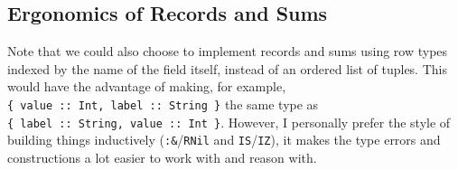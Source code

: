 \documentclass[]{article}
\newenvironment{Shaded}{}{}
\newcommand{\DataTypeTok}[1]{\textcolor[rgb]{0.56,0.13,0.00}{#1}}
\newcommand{\FunctionTok}[1]{\textcolor[rgb]{0.02,0.16,0.49}{#1}}
\newcommand{\KeywordTok}[1]{\textcolor[rgb]{0.00,0.44,0.13}{\textbf{#1}}}
\newcommand{\NormalTok}[1]{#1}
\newcommand{\OperatorTok}[1]{\textcolor[rgb]{0.40,0.40,0.40}{#1}}
\newcommand{\OtherTok}[1]{\textcolor[rgb]{0.00,0.44,0.13}{#1}}
\begin{document}
\begin{Shaded}
\end{Shaded}

\subsection{Ergonomics of Records and
Sums}\label{ergonomics-of-records-and-sums}

Note that we could also choose to implement records and sums using row types
indexed by the name of the field itself, instead of an ordered list of tuples.
This would have the advantage of making, for example,
\texttt{\{\ value\ ::\ Int,\ label\ ::\ String\ \}} the same type as
\texttt{\{\ label\ ::\ String,\ value\ ::\ Int\ \}}. However, I personally
prefer the style of building things inductively (\texttt{:\&}/\texttt{RNil} and
\texttt{IS}/\texttt{IZ}), it makes the type errors and constructions a lot
easier to work with and reason with.
\end{document}
